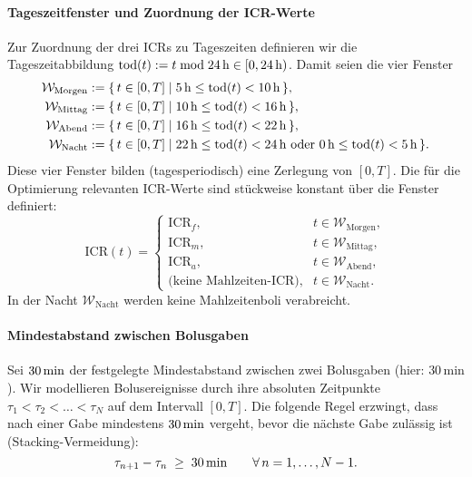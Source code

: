 \documentclass[ngerman,a4paper,12pt,pdftex]{article}
\newcommand{\ICR}{\mathrm{ICR}}
\newcommand{\ICRf}{\mathrm{ICR}_f}
\newcommand{\ICRm}{\mathrm{ICR}_m}
\newcommand{\ICRa}{\mathrm{ICR}_a}
\begin{document}
\paragraph{Tageszeitfenster und Zuordnung der ICR-Werte}
Zur Zuordnung der drei ICRs zu Tageszeiten definieren wir die Tageszeitabbildung \( \mathrm{tod}(t):= t \bmod 24\,\mathrm{h} \in [0,24\,\mathrm{h})\). Damit seien die vier Fenster
\[
\begin{aligned}
\mathcal{W}_{\mathrm{Morgen}} &:= \{\, t\in[0,T] \mid 5\,\mathrm{h} \le \mathrm{tod}(t) < 10\,\mathrm{h} \,\},\\
\mathcal{W}_{\mathrm{Mittag}} &:= \{\, t\in[0,T] \mid 10\,\mathrm{h} \le \mathrm{tod}(t) < 16\,\mathrm{h} \,\},\\
\mathcal{W}_{\mathrm{Abend}}  &:= \{\, t\in[0,T] \mid 16\,\mathrm{h} \le \mathrm{tod}(t) < 22\,\mathrm{h} \,\},\\
\mathcal{W}_{\mathrm{Nacht}}  &:= \{\, t\in[0,T] \mid 22\,\mathrm{h} \le \mathrm{tod}(t) < 24\,\mathrm{h} \ \text{oder}\ 0\,\mathrm{h} \le \mathrm{tod}(t) < 5\,\mathrm{h} \,\}.
\end{aligned}
\]
Diese vier Fenster bilden (tagesperiodisch) eine Zerlegung von \([0,T]\). Die für die Optimierung relevanten ICR-Werte sind stückweise konstant über die Fenster definiert:
\[
\ICR(t)=
\begin{cases}
\ICRf, & t \in \mathcal{W}_{\mathrm{Morgen}},\\
\ICRm, & t \in \mathcal{W}_{\mathrm{Mittag}},\\
\ICRa, & t \in \mathcal{W}_{\mathrm{Abend}},\\
\text{(keine Mahlzeiten-ICR)}, & t \in \mathcal{W}_{\mathrm{Nacht}}.
\end{cases}
\]
\noindent In der Nacht \(\mathcal{W}_{\mathrm{Nacht}}\) werden keine Mahlzeitenboli verabreicht.
\medskip

\paragraph{Mindestabstand zwischen Bolusgaben}
Sei \(30\,\mathrm{min}\) der festgelegte Mindestabstand zwischen zwei Bolusgaben (hier: \(30\,\mathrm{min}\)). Wir modellieren Bolusereignisse durch ihre absoluten Zeitpunkte \(\tau_1<\tau_2<\dots<\tau_N\) auf dem Intervall \([0,T]\). Die folgende Regel erzwingt, dass nach einer Gabe mindestens \(30\,\mathrm{min}\) vergeht, bevor die nächste Gabe zulässig ist (Stacking-Vermeidung):
\[
\tau_{n+1} - \tau_n \;\ge\; 30\,\mathrm{min} \qquad \forall\, n=1,\dots,N-1.
\]
\end{document}

